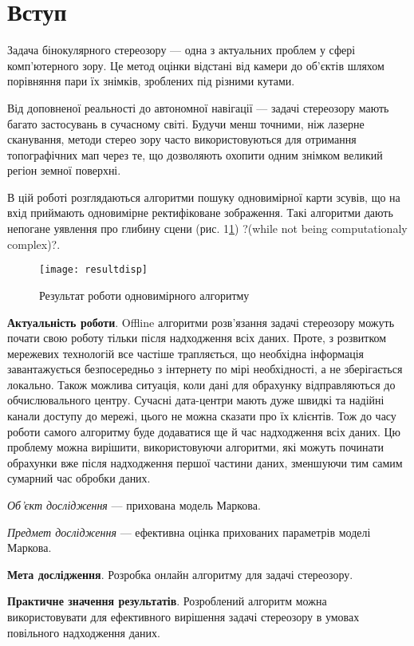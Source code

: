\chapter*{Вступ}

	Задача бінокулярного стереозору --- одна з актуальних проблем у сфері комп'ютерного зору. Це метод оцінки відстані від камери до об'єктів шляхом порівняння пари їх знімків, зроблених під різними кутами.
	
	Від доповненої реальності до автономної навігації --- задачі стереозору мають багато застосувань в сучасному світі. Будучи менш точними, ніж лазерне сканування, методи стерео зору часто використовуються для отримання топографічних мап через те, що дозволяють охопити одним знімком великий регіон земної поверхні. 

	В цій роботі розглядаються алгоритми пошуку одновимірної карти зсувів, що на вхід приймають одновимірне ректифіковане зображення. Такі алгоритми дають непогане уявлення про глибину сцени (рис. 1\ref{results}) ?(while not being computationaly complex)?.
\begin{figure}
	\centering
	\texttt{[image: resultdisp]}
	\caption{Результат роботи одновимірного алгоритму}
	\label{results}
\end{figure}
	
\textbf{Актуальність роботи}. Offline алгоритми розв'язання задачі стереозору можуть почати свою роботу тільки після надходження всіх даних. Проте, з розвитком мережевих технологій все частіше трапляється, що необхідна інформація  завантажується безпосередньо з інтернету по мірі необхідності, а не зберігається локально. Також можлива ситуація, коли дані для обрахунку відправляються до обчислювального центру. Сучасні дата-центри мають дуже швидкі та надійні канали доступу до мережі, цього не можна сказати про їх клієнтів. Тож до часу роботи самого алгоритму буде додаватися ще й час надходження всіх даних. Цю проблему можна вирішити, використовуючи алгоритми, які можуть починати обрахунки вже після надходження першої частини даних, зменшуючи тим самим сумарний час обробки даних.

\textit{Об'єкт дослідження} --- прихована модель Маркова.

\textit{Предмет дослідження} --- ефективна оцінка прихованих параметрів моделі Маркова.

\textbf{Мета дослідження}. Розробка онлайн алгоритму для задачі стереозору.

\textbf{Практичне значення результатів}. Розроблений алгоритм можна використовувати для ефективного вирішення задачі стереозору в умовах повільного надходження даних.
	
